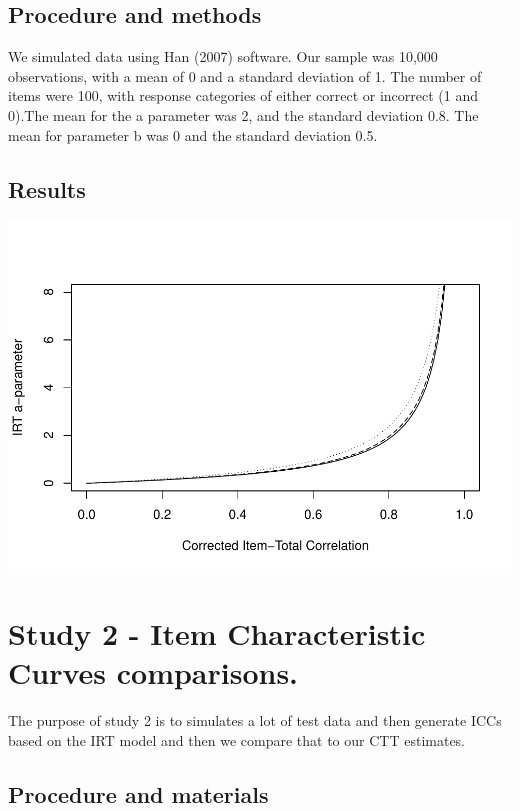 \documentclass[
  english,
  man,floatsintext]{apa6}
\begin{document}
\hypertarget{procedure-and-methods}{%
\subsection{Procedure and methods}\label{procedure-and-methods}}

We simulated data using Han (2007) software. Our sample was 10,000 observations, with a mean of 0 and a standard deviation of 1. The number of items were 100, with response categories of either correct or incorrect (1 and 0).The mean for the a parameter was 2, and the standard deviation 0.8. The mean for parameter b was 0 and the standard deviation 0.5.

\hypertarget{results}{%
\subsection{Results}\label{results}}

\includegraphics{ICC_project_files/figure-latex/acorrected simulation-1.pdf}
\newpage

\hypertarget{study-2---item-characteristic-curves-comparisons.}{%
\section{Study 2 - Item Characteristic Curves comparisons.}\label{study-2---item-characteristic-curves-comparisons.}}

The purpose of study 2 is to simulates a lot of test data and then generate ICCs based on the IRT model and then we compare that to our CTT estimates.

\hypertarget{procedure-and-materials}{%
\subsection{Procedure and materials}\label{procedure-and-materials}}
\end{document}
